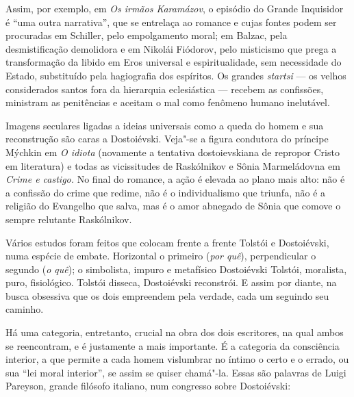 Assim, por exemplo, em \emph{Os irmãos Karamázov}, o episódio do Grande
Inquisidor é ``uma outra narrativa'', que se entrelaça ao romance e
cujas fontes podem ser procuradas em Schiller, pelo empolgamento moral;
em Balzac, pela desmistificação demolidora e em Nikolái Fiódorov, pelo
misticismo que prega a transformação da libido em Eros universal e
espiritualidade, sem necessidade do Estado, substituído pela hagiografia
dos espíritos. Os grandes \emph{startsi} --- os velhos considerados
santos fora da hierarquia eclesiástica --- recebem as confissões, ministram as penitências e aceitam o mal
como fenômeno humano inelutável.

Imagens seculares ligadas a ideias universais como a queda do homem e
sua reconstrução são caras a Dostoiévski. Veja"-se a figura condutora do
príncipe Mýchkin em \emph{O idiota} (novamente a tentativa
dostoievskiana de repropor Cristo em literatura) e todas as vicissitudes
de Raskólnikov e Sônia Marmeládovna em \emph{Crime e castigo.} No final
do romance, a ação é elevada ao plano mais alto: não é a confissão do
crime que redime, não é o individualismo que triunfa, não é a religião
do Evangelho que salva, mas é o amor abnegado de Sônia que comove o
sempre relutante Raskólnikov.

Vários estudos foram feitos que colocam frente a frente Tolstói e
Dostoiévski, numa espécie de embate. Horizontal o primeiro (\emph{por quê}),
perpendicular o segundo (\emph{o quê}); o simbolista, impuro e metafísico
Dostoiévski  Tolstói, moralista, puro, fisiológico. Tolstói disseca, Dostoiévski reconstrói. E assim por diante,
na busca obsessiva que os dois empreendem pela verdade, cada um seguindo
seu caminho.

Há uma categoria, entretanto, crucial na obra dos dois escritores, na
qual ambos se reencontram, e é justamente a mais importante. É a
categoria da consciência interior, a que permite a cada homem vislumbrar
no íntimo o certo e o errado, ou sua ``lei moral interior'', se assim
se quiser chamá"-la. Essas são palavras de Luigi Pareyson, grande
filósofo italiano, num congresso sobre Dostoiévski: 

